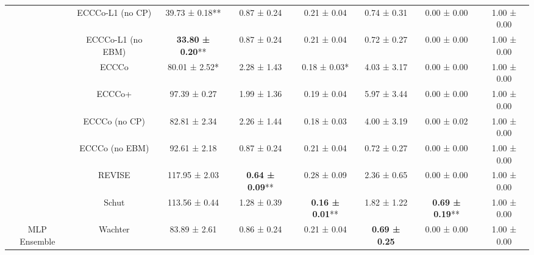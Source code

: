 \begin{table}
{\begin{tabular}[t]{cccccccc}
 & ECCCo-L1 (no CP) & 39.73 ± 0.18** & 0.87 ± 0.24\hphantom{*}\hphantom{*} & 0.21 ± 0.04\hphantom{*}\hphantom{*} & 0.74 ± 0.31\hphantom{*}\hphantom{*} & 0.00 ± 0.00\hphantom{*}\hphantom{*} & 1.00 ± 0.00\hphantom{*}\hphantom{*}\\

 & ECCCo-L1 (no EBM) & \textbf{33.80 ± 0.20}** & 0.87 ± 0.24\hphantom{*}\hphantom{*} & 0.21 ± 0.04\hphantom{*}\hphantom{*} & 0.72 ± 0.27\hphantom{*}\hphantom{*} & 0.00 ± 0.00\hphantom{*}\hphantom{*} & 1.00 ± 0.00\hphantom{*}\hphantom{*}\\

 & ECCCo & 80.01 ± 2.52*\hphantom{*} & 2.28 ± 1.43\hphantom{*}\hphantom{*} & 0.18 ± 0.03*\hphantom{*} & 4.03 ± 3.17\hphantom{*}\hphantom{*} & 0.00 ± 0.00\hphantom{*}\hphantom{*} & 1.00 ± 0.00\hphantom{*}\hphantom{*}\\

 & ECCCo+ & 97.39 ± 0.27\hphantom{*}\hphantom{*} & 1.99 ± 1.36\hphantom{*}\hphantom{*} & 0.19 ± 0.04\hphantom{*}\hphantom{*} & 5.97 ± 3.44\hphantom{*}\hphantom{*} & 0.00 ± 0.00\hphantom{*}\hphantom{*} & 1.00 ± 0.00\hphantom{*}\hphantom{*}\\

 & ECCCo (no CP) & 82.81 ± 2.34\hphantom{*}\hphantom{*} & 2.26 ± 1.44\hphantom{*}\hphantom{*} & 0.18 ± 0.03\hphantom{*}\hphantom{*} & 4.00 ± 3.19\hphantom{*}\hphantom{*} & 0.00 ± 0.02\hphantom{*}\hphantom{*} & 1.00 ± 0.00\hphantom{*}\hphantom{*}\\

 & ECCCo (no EBM) & 92.61 ± 2.18\hphantom{*}\hphantom{*} & 0.87 ± 0.24\hphantom{*}\hphantom{*} & 0.21 ± 0.04\hphantom{*}\hphantom{*} & 0.72 ± 0.27\hphantom{*}\hphantom{*} & 0.00 ± 0.00\hphantom{*}\hphantom{*} & 1.00 ± 0.00\hphantom{*}\hphantom{*}\\

 & REVISE & 117.95 ± 2.03\hphantom{*}\hphantom{*} & \textbf{0.64 ± 0.09}** & 0.28 ± 0.09\hphantom{*}\hphantom{*} & 2.36 ± 0.65\hphantom{*}\hphantom{*} & 0.00 ± 0.00\hphantom{*}\hphantom{*} & 1.00 ± 0.00\hphantom{*}\hphantom{*}\\

 & Schut & 113.56 ± 0.44\hphantom{*}\hphantom{*} & 1.28 ± 0.39\hphantom{*}\hphantom{*} & \textbf{0.16 ± 0.01}** & 1.82 ± 1.22\hphantom{*}\hphantom{*} & \textbf{0.69 ± 0.19}** & 1.00 ± 0.00\hphantom{*}\hphantom{*}\\

\multirow[t]{-10}{*}{\centering\arraybackslash MLP Ensemble} & Wachter & 83.89 ± 2.61\hphantom{*}\hphantom{*} & 0.86 ± 0.24\hphantom{*}\hphantom{*} & 0.21 ± 0.04\hphantom{*}\hphantom{*} & \textbf{0.69 ± 0.25}\hphantom{*}\hphantom{*} & 0.00 ± 0.00\hphantom{*}\hphantom{*} & 1.00 ± 0.00\hphantom{*}\hphantom{*}\\
\bottomrule
\end{tabular}}
\end{table}
